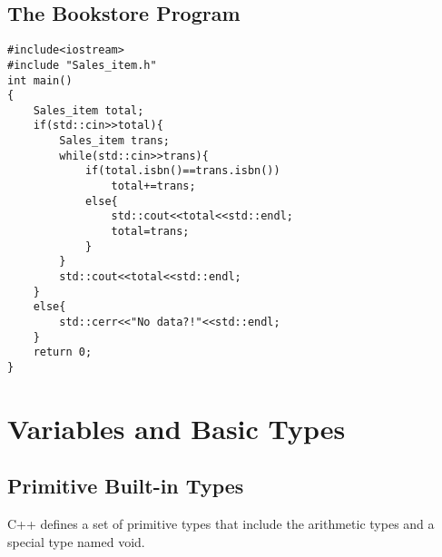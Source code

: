 \documentclass[11pt]{article}
\begin{document}
\subsection{The Bookstore Program}
\label{sec-1-6}
\begin{verbatim}
#include<iostream>
#include "Sales_item.h"
int main()
{
    Sales_item total;
    if(std::cin>>total){
        Sales_item trans;
        while(std::cin>>trans){
            if(total.isbn()==trans.isbn())
                total+=trans;
            else{
                std::cout<<total<<std::endl;
                total=trans;
            }
        }
        std::cout<<total<<std::endl;
    }
    else{
        std::cerr<<"No data?!"<<std::endl;
    }
    return 0;
}
\end{verbatim}
\section{Variables and Basic Types}
\label{sec-2}
\subsection{Primitive Built-in Types}
\label{sec-2-1}
C++ defines a set of primitive types that include the arithmetic types and a special type
named void.
\end{document}
